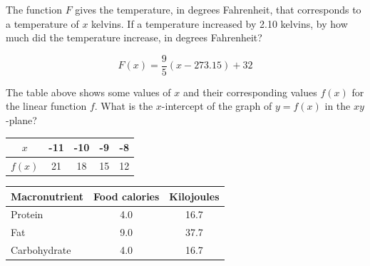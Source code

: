 
\vspace{2em}

\noindent\markforreview

\vspace{1em}

The function \( F \) gives the temperature, in degrees Fahrenheit, that corresponds to a temperature of \( x \) kelvins. If a temperature increased by 2.10 kelvins, by how much did the temperature increase, in degrees Fahrenheit?

\[
F(x) = \frac{9}{5}(x - 273.15) + 32
\]

\vspace{0.75em}


\newpage



\noindent\markforreview

\vspace{1em}

The table above shows some values of \( x \) and their corresponding values \( f(x) \) for the linear function \( f \). What is the \( x \)-intercept of the graph of \( y = f(x) \) in the \( xy \)-plane?

\begin{center}
\begin{tabular}{|c|c|c|c|c|}
\hline
$x$ & -11 & -10 & -9 & -8 \\
\hline
$f(x)$ & 21 & 18 & 15 & 12 \\
\hline
\end{tabular}
\end{center}

\vspace{0.75em}



\newpage
\noindent\markforreview

\vspace{1em}

\begin{center}
\begin{tabular}{|l|c|c|}
\hline
\textbf{Macronutrient} & \textbf{Food calories} & \textbf{Kilojoules} \\
\hline
Protein     & 4.0 & 16.7 \\
Fat         & 9.0 & 37.7 \\
Carbohydrate & 4.0 & 16.7 \\
\hline
\end{tabular}
\end{center}

